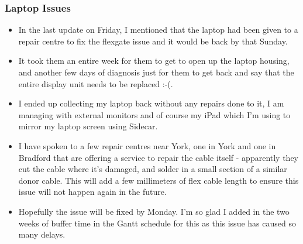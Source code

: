 \subsubsection{Laptop Issues}

\begin{itemize}
    \item In the last update on Friday, I mentioned that the laptop had been given to a repair centre to fix the flexgate issue and it would be back by that Sunday.
    \item It took them an entire week for them to get to open up the laptop housing, and another few days of diagnosis just for them to get back and say that the entire display unit needs to be replaced :-(.
    \item I ended up collecting my laptop back without any repairs done to it, I am managing with external monitors and of course my iPad which I'm using to mirror my laptop screen using Sidecar.
    \item I have spoken to a few repair centres near York, one in York and one in Bradford that are offering a service to repair the cable itself - apparently they cut the cable where it's damaged, and solder in a small section of a similar donor cable. This will add a few millimeters of flex cable length to ensure this issue will not happen again in the future.
    \item Hopefully the issue will be fixed by Monday. I'm so glad I added in the two weeks of buffer time in the Gantt schedule for this as this issue has caused so many delays.
\end{itemize}
